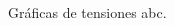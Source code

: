 \documentclass[a4paper, 10pt, onecolumn,journal]{ieeeconf}
\begin{document}
\begin{figure}[H]
	\centering
	\begin{adjustbox}{scale=0.5,max width=\columnwidth}
	\end{adjustbox}
	\caption{Gráficas de tensiones abc.}
	\label{Gráficas de tensiones abc}
\end{figure}
\end{document}
